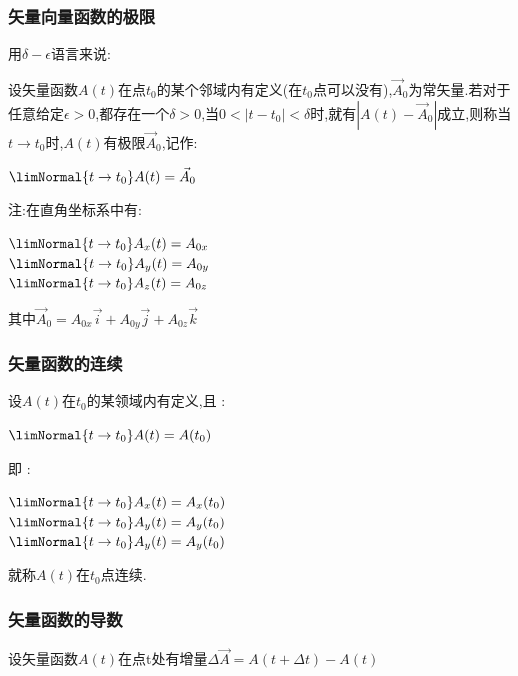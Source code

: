 {{{    \subsubsection{矢量向量函数的极限}{
      用$\delta-\epsilon$语言来说:

      设矢量函数$A(t)$在点$t_0$的某个邻域内有定义(在$t_0$点可以没有),$\vec{A}_0$为常矢量.若对于任意给定$\epsilon > 0$,都存在一个$\delta > 0$,当$0 < |t - t_0| < \delta$时,就有$|A(t) - \vec{A}_0|$成立,则称当$t \to t_0$时,$A(t)$有极限$\vec{A}_0$,记作:

      \begin{center}
        $\limNormal{t \to t_0}A(t) = \vec{A}_0$
      \end{center}

      注:在直角坐标系中有:

      \begin{center}
        $\limNormal{t \to t_0}A_x(t) = A_{0x}$ \\
        $\limNormal{t \to t_0}A_y(t) = A_{0y}$ \\
        $\limNormal{t \to t_0}A_z(t) = A_{0z}$
      \end{center}

      其中$\vec{A}_0 = A_{0x}\vec{i} + A_{0y}\vec{j} + A_{0z}\vec{k}$
    }%

    \subsubsection{矢量函数的连续}{
      设$A(t)$在$t_0$的某领域内有定义,且 :

      \begin{center}
        $\limNormal{t \to t_0}A(t) = A(t_0)$
      \end{center}

      即 :

      \begin{center}
        $\limNormal{t \to t_0}A_x(t) = A_x(t_0)$ \\
        $\limNormal{t \to t_0}A_y(t) = A_y(t_0)$ \\
        $\limNormal{t \to t_0}A_y(t) = A_y(t_0)$
      \end{center}

      就称$A(t)$在$t_0$点连续.
    }%

    \subsubsection{矢量函数的导数}{
      设矢量函数$A(t)$在点t处有增量$\Delta \vec{A} = A(t + \Delta t) - A(t)$

}}}}
